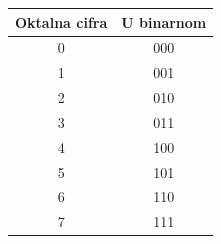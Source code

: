 \begin{tabular}{cc}\toprule
Oktalna cifra & U binarnom\\\midrule
0 & 000\\
1 & 001\\
2 & 010\\
3 & 011\\
4 & 100\\
5 & 101\\
6 & 110\\
7 & 111\\
\bottomrule\end{tabular}
